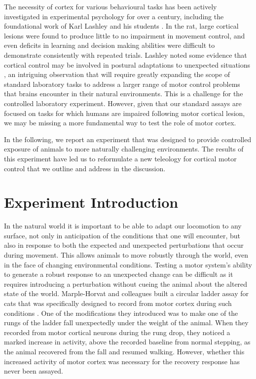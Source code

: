 The necessity of cortex for various behavioural tasks has been actively investigated in experimental psychology for over a century, including the foundational work of Karl Lashley and his students \cite{Lashley1950a}. In the rat, large cortical lesions were found to produce little to no impairment in movement control, and even deficits in learning and decision making abilities were difficult to demonstrate consistently with repeated trials. Lashley noted some evidence that cortical control may be involved in postural adaptations to unexpected situations \cite{Lashley1921a}, an intriguing observation that will require greatly expanding the scope of standard laboratory tasks to address a larger range of motor control problems that brains encounter in their natural environments. This is a challenge for the controlled laboratory experiment. However, given that our standard assays are focused on tasks for which humans are impaired following motor cortical lesion, we may be missing a more fundamental way to test the role of motor cortex.

In the following, we report an experiment that was designed to provide controlled exposure of animals to more naturally challenging environments. The results of this experiment have led us to reformulate a new teleology for cortical motor control that we outline and address in the discussion.

\section{Experiment Introduction}

In the natural world it is important to be able to adapt our locomotion to any surface, not only in anticipation of the conditions that one will encounter, but also in response to both the expected and unexpected perturbations that occur during movement. This allows animals to move robustly through the world, even in the face of changing environmental conditions. Testing a motor system's ability to generate a robust response to an unexpected change can be difficult as it requires introducing a perturbation without cueing the animal about the altered state of the world. Marple-Horvat and colleagues built a circular ladder assay for cats that was specifically designed to record from motor cortex during such conditions \cite{Marple-Horvat1993}. One of the modifications they introduced was to make one of the rungs of the ladder fall unexpectedly under the weight of the animal. When they recorded from motor cortical neurons during the rung drop, they noticed a marked increase in activity, above the recorded baseline from normal stepping, as the animal recovered from the fall and resumed walking. However, whether this increased activity of motor cortex was necessary for the recovery response has never been assayed.

